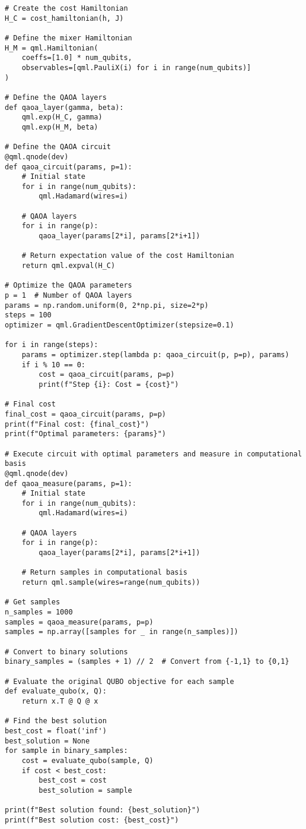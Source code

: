 \begin{verbatim}
# Create the cost Hamiltonian
H_C = cost_hamiltonian(h, J)

# Define the mixer Hamiltonian
H_M = qml.Hamiltonian(
    coeffs=[1.0] * num_qubits,
    observables=[qml.PauliX(i) for i in range(num_qubits)]
)

# Define the QAOA layers
def qaoa_layer(gamma, beta):
    qml.exp(H_C, gamma)
    qml.exp(H_M, beta)

# Define the QAOA circuit
@qml.qnode(dev)
def qaoa_circuit(params, p=1):
    # Initial state
    for i in range(num_qubits):
        qml.Hadamard(wires=i)

    # QAOA layers
    for i in range(p):
        qaoa_layer(params[2*i], params[2*i+1])

    # Return expectation value of the cost Hamiltonian
    return qml.expval(H_C)

# Optimize the QAOA parameters
p = 1  # Number of QAOA layers
params = np.random.uniform(0, 2*np.pi, size=2*p)
steps = 100
optimizer = qml.GradientDescentOptimizer(stepsize=0.1)

for i in range(steps):
    params = optimizer.step(lambda p: qaoa_circuit(p, p=p), params)
    if i % 10 == 0:
        cost = qaoa_circuit(params, p=p)
        print(f"Step {i}: Cost = {cost}")

# Final cost
final_cost = qaoa_circuit(params, p=p)
print(f"Final cost: {final_cost}")
print(f"Optimal parameters: {params}")

# Execute circuit with optimal parameters and measure in computational basis
@qml.qnode(dev)
def qaoa_measure(params, p=1):
    # Initial state
    for i in range(num_qubits):
        qml.Hadamard(wires=i)

    # QAOA layers
    for i in range(p):
        qaoa_layer(params[2*i], params[2*i+1])

    # Return samples in computational basis
    return qml.sample(wires=range(num_qubits))

# Get samples
n_samples = 1000
samples = qaoa_measure(params, p=p)
samples = np.array([samples for _ in range(n_samples)])

# Convert to binary solutions
binary_samples = (samples + 1) // 2  # Convert from {-1,1} to {0,1}

# Evaluate the original QUBO objective for each sample
def evaluate_qubo(x, Q):
    return x.T @ Q @ x

# Find the best solution
best_cost = float('inf')
best_solution = None
for sample in binary_samples:
    cost = evaluate_qubo(sample, Q)
    if cost < best_cost:
        best_cost = cost
        best_solution = sample

print(f"Best solution found: {best_solution}")
print(f"Best solution cost: {best_cost}")
\end{verbatim}


